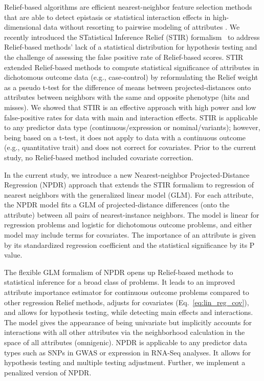 \documentclass[10pt]{article}
\begin{document}
Relief-based algorithms are efficient nearest-neighbor feature selection methods that are able to detect epistasis or statistical interaction effects in high-dimensional data without resorting to pairwise modeling of attributes \cite{urbanowicz17b,kononenko97, mckinney09, robnik2003theoretical}.
We recently introduced the STatistical Inference Relief (STIR) formalism~\cite{stir} to address Relief-based methods' lack of a statistical distribution for hypothesis testing and the challenge of assessing the false positive rate of Relief-based scores.
STIR extended Relief-based methods to compute statistical significance of attributes in dichotomous outcome data (e.g., case-control) by reformulating the Relief weight~\cite{mckinney13} as a pseudo t-test for the difference of means between projected-distances onto attributes between neighbors with the same and opposite phenotype (hits and misses). We showed that STIR is an effective approach with high power and low false-positive rates for data with main and interaction effects. 
STIR is applicable to any predictor data type (continuous/expression or nominal/variants); however, being based on a t-test, it does not apply to data with a continuous outcome (e.g., quantitative trait) and does not correct for covariates.
Prior to the current study, no Relief-based method included covariate correction.  

In the current study, we introduce a new Nearest-neighbor Projected-Distance Regression (NPDR) approach that extends the STIR formalism to regression of nearest neighbors with the generalized linear model (GLM). For each attribute, the NPDR model fits a GLM of projected-distance differences (onto the attribute) between all pairs of nearest-instance neighbors.
The model is linear for regression problems and logistic for dichotomous outcome problems, and either model may include terms for covariates.
The importance of an attribute is given by its standardized regression coefficient and the statistical significance by its P value.

The flexible GLM formalism of NPDR opens up Relief-based methods to statistical inference for a broad class of problems.
It leads to an improved attribute importance estimator for continuous outcome problems compared to other regression Relief methods, adjusts for covariates (Eq.~\ref{eq:lin_reg_cov}), and allows for hypothesis testing, while detecting main effects and interactions. The model gives the appearance of being univariate but implicitly accounts for interactions with all other attributes via the neighborhood calculation in the space of all attributes (omnigenic).
NPDR is applicable to any predictor data types such as SNPs in GWAS or expression in RNA-Seq analyses.
It allows for hypothesis testing and multiple testing adjustment. Further, we implement a penalized version of NPDR.
\end{document}
